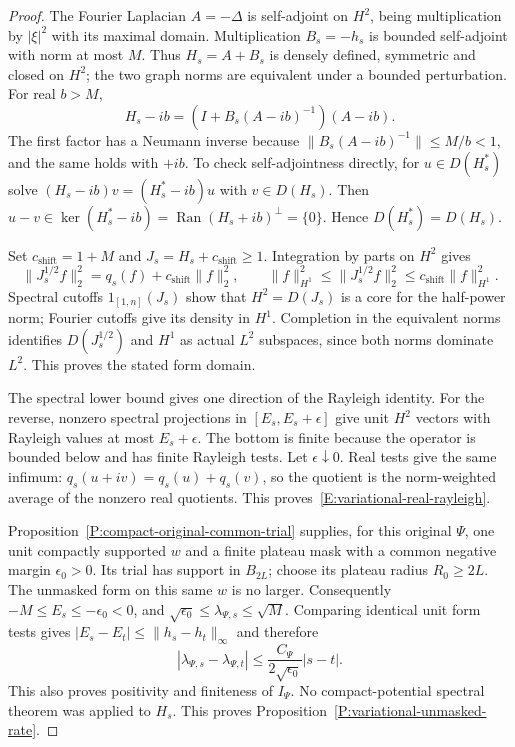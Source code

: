 \begin{proof}
  The Fourier Laplacian $A=-\Delta$ is self-adjoint on $H^2$,
  being multiplication by $|\xi|^2$ with its maximal domain.
  Multiplication $B_s=-h_s$ is bounded self-adjoint with norm at
  most $M$. Thus $H_s=A+B_s$ is densely defined, symmetric and
  closed on $H^2$; the two graph norms are equivalent under a
  bounded perturbation.
  For real $b>M$,
  \[
    H_s-ib=(I+B_s(A-ib)^{-1})(A-ib).
  \]
  The first factor has a Neumann inverse because
  $\|B_s(A-ib)^{-1}\|\le M/b<1$, and the same holds with $+ib$.
  To check self-adjointness directly, for $u\in D(H_s^*)$ solve
  $(H_s-ib)v=(H_s^*-ib)u$ with $v\in D(H_s)$.
  Then $u-v\in\ker(H_s^*-ib)=\operatorname{Ran}(H_s+ib)^\perp
  =\{0\}$. Hence $D(H_s^*)=D(H_s)$.

  Set $c_{\mathrm{shift}}=1+M$ and $J_s=H_s+c_{\mathrm{shift}}\ge1$.
  Integration by parts on $H^2$ gives
  \[
    \|J_s^{1/2}f\|_2^2=q_s(f)+c_{\mathrm{shift}}\|f\|_2^2,\qquad
    \|f\|_{H^1}^2\le\|J_s^{1/2}f\|_2^2
    \le c_{\mathrm{shift}}\|f\|_{H^1}^2.
  \]
  Spectral cutoffs $1_{[1,n]}(J_s)$ show that $H^2=D(J_s)$
  is a core for the half-power norm; Fourier cutoffs give its
  density in $H^1$. Completion in the equivalent norms identifies
  $D(J_s^{1/2})$ and $H^1$ as actual $L^2$ subspaces, since both
  norms dominate $L^2$. This proves the stated form domain.

  The spectral lower bound gives one direction of the Rayleigh
  identity. For the reverse, nonzero spectral projections in
  $[E_s,E_s+\epsilon]$ give unit $H^2$ vectors with Rayleigh
  values at most $E_s+\epsilon$. The bottom is finite because
  the operator is bounded below and has finite Rayleigh tests.
  Let $\epsilon\downarrow0$. Real tests give the same infimum:
  $q_s(u+iv)=q_s(u)+q_s(v)$, so the quotient is the norm-weighted
  average of the nonzero real quotients.
  This proves~\eqref{E:variational-real-rayleigh}.

  Proposition~\ref{P:compact-original-common-trial} supplies, for
  this original $\Psi$, one unit compactly supported $w$ and a
  finite plateau mask with a common negative margin $\epsilon_0>0$.
  Its trial has support in $B_{2L}$; choose its plateau radius
  $R_0\ge2L$. The unmasked form on this same $w$ is no larger.
  Consequently $-M\le E_s\le-\epsilon_0<0$, and
  $\sqrt{\epsilon_0}\le\lambda_{\Psi,s}\le\sqrt M$.
  Comparing identical unit form tests gives
  $|E_s-E_t|\le\|h_s-h_t\|_\infty$ and therefore
  \[
    |\lambda_{\Psi,s}-\lambda_{\Psi,t}|
    \le \frac{C_\Psi}{2\sqrt{\epsilon_0}}|s-t|.
  \]
  This also proves positivity and finiteness of $I_\Psi$.
  No compact-potential spectral theorem was applied to $H_s$.
  This proves Proposition~\ref{P:variational-unmasked-rate}.
\end{proof}

